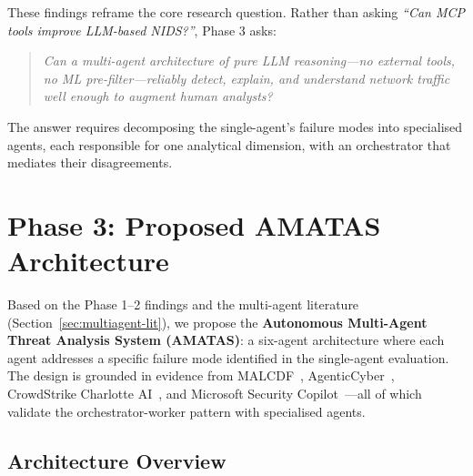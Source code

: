 \documentclass[12pt, a4paper, oneside]{report}
\begin{document}
These findings reframe the core research question. Rather than asking
\emph{``Can MCP tools improve LLM-based NIDS?''}, Phase 3 asks:

\begin{quote}
\emph{Can a multi-agent architecture of pure LLM reasoning---no external
tools, no ML pre-filter---reliably detect, explain, and understand network
traffic well enough to augment human analysts?}
\end{quote}

The answer requires decomposing the single-agent's failure modes into
specialised agents, each responsible for one analytical dimension, with
an orchestrator that mediates their disagreements.


\chapter{Phase 3: Proposed AMATAS Architecture}
\label{ch:phase3}

Based on the Phase 1--2 findings and the multi-agent literature
(Section~\ref{sec:multiagent-lit}), we propose the \textbf{Autonomous Multi-Agent
Threat Analysis System (AMATAS)}: a six-agent architecture where each agent
addresses a specific failure mode identified in the single-agent evaluation. The
design is grounded in evidence from MALCDF~\cite{malcdf2025},
AgenticCyber~\cite{agenticcyber2025}, CrowdStrike Charlotte
AI~\cite{crowdstrike2024charlotte}, and Microsoft Security
Copilot~\cite{microsoft2025copilot}---all of which validate the
orchestrator-worker pattern with specialised agents.

\section{Architecture Overview}
\end{document}

